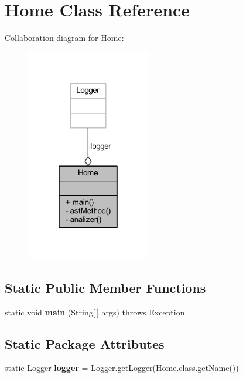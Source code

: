 \hypertarget{class_home}{\section{Home Class Reference}
\label{class_home}
}


Collaboration diagram for Home\-:\nopagebreak
\begin{figure}[H]
\begin{center}
\leavevmode
\includegraphics[width=154pt]{class_home__coll__graph}
\end{center}
\end{figure}
\subsection*{Static Public Member Functions}
\begin{DoxyCompactItemize}
\item 
\hypertarget{class_home_a824a2d585cb36f1a452ebc5db9b49ed0}{static void {\bfseries main} (String\mbox{[}$\,$\mbox{]} args)  throws Exception}\label{class_home_a824a2d585cb36f1a452ebc5db9b49ed0}

\end{DoxyCompactItemize}
\subsection*{Static Package Attributes}
\begin{DoxyCompactItemize}
\item 
\hypertarget{class_home_ac74d97ae59ddf53153a62e8790619756}{static Logger {\bfseries logger} = Logger.\-get\-Logger(Home.\-class.\-get\-Name())}\label{class_home_ac74d97ae59ddf53153a62e8790619756}

\end{DoxyCompactItemize}

